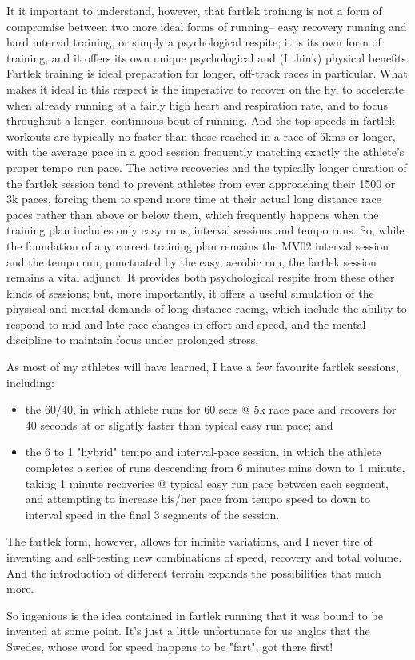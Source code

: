 It it important to understand, however, that fartlek training is not a form of compromise between two more ideal forms of running-- easy recovery running and hard interval training, or simply a psychological respite; it is its own form of training, and it offers its own unique psychological and (I think) physical benefits. Fartlek training is ideal preparation for longer, off-track races in particular. What makes it ideal in this respect is the imperative to recover on the fly, to accelerate when already running at a fairly high heart and respiration rate, and to focus throughout a longer, continuous bout of running. And the top speeds in fartlek workouts are typically no faster than those reached in a race of 5kms or longer, with the average pace in a good session frequently matching exactly the athlete's proper tempo run pace. The active recoveries and the typically longer duration of the fartlek session tend to prevent athletes from ever approaching their 1500 or 3k paces, forcing them to spend more time at their actual long distance race paces rather than above or below them, which frequently happens when the training plan includes only easy runs, interval sessions and tempo runs. So, while the foundation of any correct training plan remains the MV02 interval session and the tempo run, punctuated by the easy, aerobic run, the fartlek session remains a vital adjunct. It provides both psychological respite from these other kinds of sessions; but, more importantly, it offers a useful simulation of the physical and mental demands of long distance racing, which include the ability to respond to mid and late race changes in effort and speed, and the mental discipline to maintain focus under prolonged stress.

As most of my athletes will have learned, I have a few favourite fartlek sessions, including:

\begin{itemize}
    \item the 60/40, in which athlete runs for 60 secs @ 5k race pace and recovers for 40 seconds at or slightly faster than typical easy run pace; and
    \item the 6 to 1 "hybrid" tempo and interval-pace session, in which the athlete completes a series of runs descending from 6 minutes mins down to 1 minute, taking 1 minute recoveries @ typical easy run pace between each segment, and attempting to increase his/her pace from tempo speed to down to interval speed in the final 3 segments of the session.
\end{itemize}

The fartlek form, however, allows for infinite variations, and I never tire of inventing and self-testing new combinations of speed, recovery and total volume. And the introduction of different terrain expands the possibilities that much more.

So ingenious is the idea contained in fartlek running that it was bound to be invented at some point. It's just a little unfortunate for us anglos that the Swedes, whose word for speed happens to be "fart", got there first!

